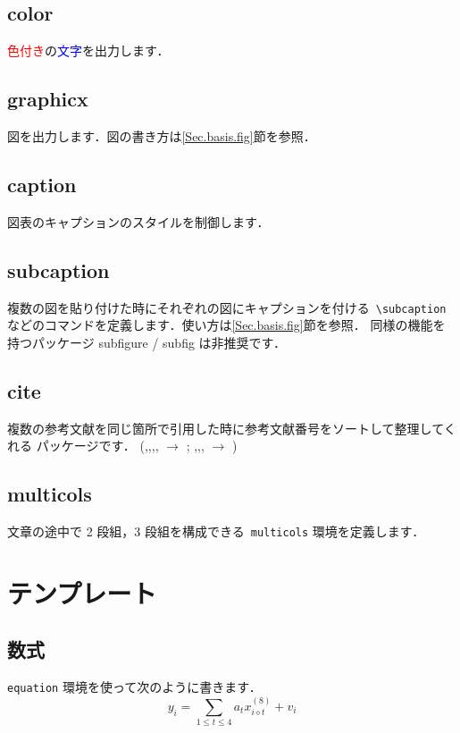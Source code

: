 \documentclass[dvipdfmx,report,disablejfam,nosetpagesize,12pt]{jsbook}
\begin{document}
\subsection*{color}
\textcolor{red}{色付き}の\textcolor{blue}{文字}を\textcolor[rgb]{0,0.5,0}{出力}します．

\subsection*{graphicx}
図を出力します．図の書き方は\ref{Sec.basis.fig}節を参照．

\subsection*{caption}
図表のキャプションのスタイルを制御します．

\subsection*{subcaption}
複数の図を貼り付けた時にそれぞれの図にキャプションを付ける\ \verb+\subcaption+
などのコマンドを定義します．使い方は\ref{Sec.basis.fig}節を参照．
同様の機能を持つパッケージ subfigure / subfig は非推奨です．

\subsection*{cite}
複数の参考文献を同じ箇所で引用した時に参考文献番号をソートして整理してくれる
パッケージです．
(\cite{Keys1981},\cite{Hou1978},\cite{Jensen1995},\cite{Xin2000},
\cite{Muresan2004}
$\rightarrow$ \cite{Keys1981,Hou1978,Jensen1995,Xin2000,Muresan2004};
\cite{Hou1978},\cite{Carey1999},\cite{Zhang2006},\cite{Muresan2004}
$\rightarrow$ \cite{Hou1978,Carey1999,Zhang2006,Muresan2004,Yoneji2005,Takagi2016})

\subsection*{multicols}
文章の途中で 2 段組，3 段組を構成できる\ \verb+multicols+ 環境を定義します．

\section{テンプレート}

\subsection{数式}
\verb+equation+ 環境を使って次のように書きます．
\begin{equation}
   y_i = \sum_{1\leq t\leq 4} a_t x_{i\diamond t}^{(8)} + v_i
   \label{eq:singleline}
\end{equation}
\end{document}
